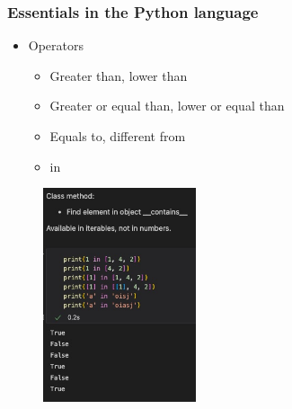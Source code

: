 \begin{frame}\frametitle{Essentials in the Python language}
   \begin{minipage}{0.48\linewidth}
      \begin{itemize}
         \item Operators
         \begin{itemize}
            \item Greater than, lower than
            \item Greater or equal than, lower or equal than
            \item Equals to, different from
            \item in
         \end{itemize}
      \end{itemize}
   \end{minipage}
   \begin{minipage}{0.48\linewidth}
      \begin{figure}[H]
         \includegraphics[width=4.5cm]{../images/illustrations/in.jpg}
      \end{figure}
   \end{minipage}
\end{frame}

